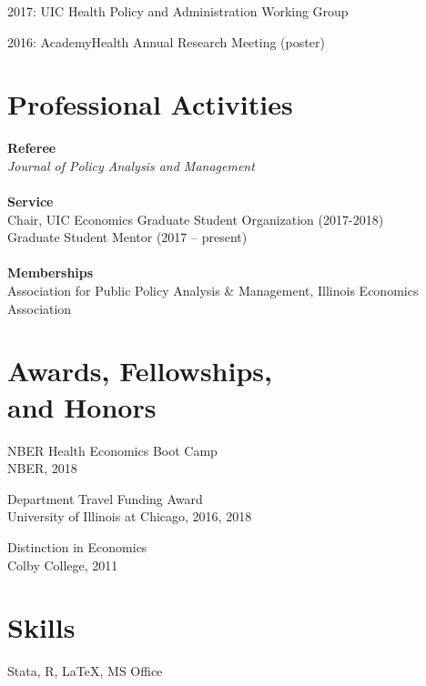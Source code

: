 \documentclass[margin, 10pt]{res} %
\begin{document}
\begin{resume}
2017: UIC Health Policy and Administration Working Group

2016: AcademyHealth Annual Research Meeting (poster)


\section{Professional Activities}
\textbf{Referee}\\
\textit{Journal of Policy Analysis and Management}
\\\\
\textbf{Service}\\
Chair, UIC Economics Graduate Student Organization (2017-2018)
\\
Graduate Student Mentor (2017 -- present)
\\\\
\textbf{Memberships}\\
Association for Public Policy Analysis \& Management, Illinois Economics Association
\section{Awards, Fellowships, \\and Honors}
NBER Health Economics Boot Camp \\
NBER, 2018

Department Travel Funding Award \\
University of Illinois at Chicago, 2016, 2018

Distinction in Economics \\
Colby College, 2011


\section{Skills}
Stata, R, \LaTeX, MS Office
\\



\end{resume}
\end{document}
